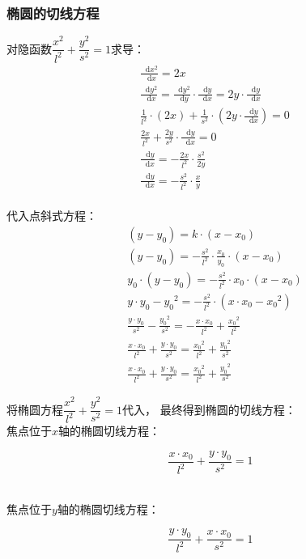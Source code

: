 \documentclass[UTF8]{ctexart}
\newcommand*{\dif}{\mathop{}\!\mathrm{d}}
\begin{document}
\subsubsection{椭圆的切线方程}
    对隐函数$\dfrac{x^2}{l^2}+\dfrac{y^2}{s^2}=1$求导：
    \setcounter{equation}{0}
    \begin{align}
        &\frac{\dif x^2}{\dif x}=2x\\[4mm]
        &\frac{\dif y^2}{\dif x}=\frac{\dif y^2}{\dif y}\cdot\frac{\dif y}{\dif x}=2y\cdot\frac{\dif y}{\dif x}\\[6mm]
        &\frac{1}{l^2}\cdot(2x)+\frac{1}{s^2}\cdot(2y\cdot\frac{\dif y}{\dif x})=0\\[5mm]
        &\frac{2x}{l^2}+\frac{2y}{s^2}\cdot\frac{\dif y}{\dif x}=0\\[4mm]
        &\frac{\dif y}{\dif x}=-\frac{2x}{l^2}\cdot\frac{s^2}{2y}\\[4mm]
        &\frac{\dif y}{\dif x}=-\frac{s^2}{l^2}\cdot\frac{x}{y}
    \end{align}\\
    代入点斜式方程：
    \begin{align}
        &(y-y_0)=k\cdot(x-x_0)\\[4mm]
        &(y-y_0)=-\frac{s^2}{l^2}\cdot\frac{x_0}{y_0}\cdot(x-x_0)\\[4mm]
        &y_0\cdot(y-y_0)=-\frac{s^2}{l^2}\cdot x_0\cdot(x-x_0)\\[4mm]
        &y\cdot y_0-{y_0}^2=-\frac{s^2}{l^2}\cdot(x\cdot x_0-{x_0}^2)\\[4mm]
        &\frac{y\cdot y_0}{s^2}-\frac{{y_0}^2}{s^2}=-\frac{x\cdot x_0}{l^2}+\frac{{x_0}^2}{l^2}\\[6mm]
        &\frac{x\cdot x_0}{l^2}+\frac{y\cdot y_0}{s^2}=\frac{{x_0}^2}{l^2}+\frac{{y_0}^2}{s^2}\\[6mm]
        &\frac{x\cdot x_0}{l^2}+\frac{y\cdot y_0}{s^2}=\frac{{x_0}^2}{l^2}+\frac{{y_0}^2}{s^2}
    \end{align}

\newpage

    将椭圆方程$\dfrac{x^2}{l^2}+\dfrac{y^2}{s^2}=1$代入，
    最终得到椭圆的切线方程：\\[4mm]
    焦点位于$x$轴的椭圆切线方程：
    \begin{large}
        \begin{equation*}
            \frac{x \cdot x_0}{l^2}+\frac{y \cdot y_0}{s^2}=1
        \end{equation*}
    \end{large}\\
    焦点位于$y$轴的椭圆切线方程：
    \begin{large}
        \begin{equation*}
            \frac{y \cdot y_0}{l^2}+\frac{x \cdot x_0}{s^2}=1
        \end{equation*}
    \end{large}\\
\end{document}
